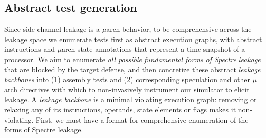 % 


\subsection{Abstract test generation}

Since side-channel leakage is a $\mu$arch behavior, to be comprehensive across the leakage space we enumerate tests first as abstract execution graphs, with abstract instructions and $\mu$arch state annotations that represent a time snapshot of a processor. We aim to enumerate \textit{all possible fundamental forms of Spectre leakage} that are blocked by the target defense, and then concretize these abstract \textit{leakage backbones} 
into (1) assembly tests and (2) corresponding speculation and other $\mu$arch directives with which to non-invasively instrument our simulator to elicit leakage. A \emph{leakage backbone} is a minimal violating execution graph: removing or relaxing any of its instructions, operands, state elements or flags makes it non-violating. First, we must have a format for comprehensive enumeration of the forms of Spectre leakage.

